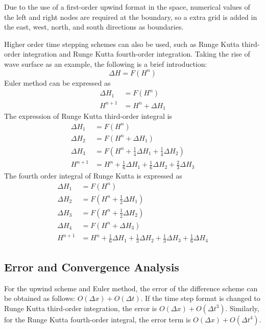 \documentclass[10pt,a4paper]{article}
\begin{document}
Due to the use of a first-order upwind format in the space, numerical values of the left and right nodes are required at the boundary, so a extra grid is added in the east, west, north, and south directions as boundaries.

Higher order time stepping schemes can also be used, such as Runge Kutta third-order integration and Runge Kutta fourth-order integration. Taking the rise of wave surface as an example, the following is a brief introduction:
\begin{equation}
	\Delta H = F(H^n)
\end{equation}
Euler method can be expressed as
\begin{equation}
	\begin{aligned}
		\Delta H_1 &= F(H^n)\\
		H^{n+1} &= H^n + \Delta H_1
	\end{aligned}
\end{equation}
The expression of Runge Kutta third-order integral is
\begin{equation}
	\begin{aligned}
		\Delta H_1 &= F(H^n)\\
		\Delta H_2 &= F(H^n + \Delta H_1)\\
		\Delta H_3 &= F(H^n + \frac{1}{4}\Delta H_1 + \frac{1}{4}\Delta H_2)\\
		H^{n+1} &= H^n + \frac{1}{6}\Delta H_1 + \frac{1}{6}\Delta H_2 + \frac{2}{3}\Delta H_3
	\end{aligned}
\end{equation}
The fourth order integral of Runge Kutta is expressed as
\begin{equation}
	\begin{aligned}
		\Delta H_1 &= F(H^n)\\
		\Delta H_2 &= F(H^n + \frac{1}{2}\Delta H_1)\\
		\Delta H_3 &= F(H^n + \frac{1}{2}\Delta H_2)\\
		\Delta H_4 &= F(H^n + \Delta H_3)\\
		H^{n+1} &= H^n + \frac{1}{6}\Delta H_1 + \frac{1}{3}\Delta H_2 + \frac{1}{3}\Delta H_3 + \frac{1}{6}\Delta H_4
	\end{aligned}
\end{equation}
\subsection{Error and Convergence Analysis}
For the upwind scheme and Euler method, the error of the difference scheme can be obtained as follows: $O(\Delta x) + O(\Delta t)$. If the time step format is changed to Runge Kutta third-order integration, the error is $O(\Delta x) + O(\Delta t^3)$. Similarly, for the Runge Kutta fourth-order integral, the error term is $O(\Delta x) + O(\Delta t^4)$.
\end{document}
